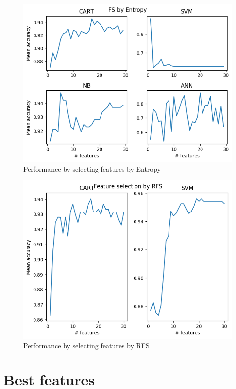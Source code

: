 \documentclass{kththesis}
\begin{document}
\begin{figure}[ht!]
  \includegraphics[width=\linewidth]{../plots/FS_by_Entropy.png}
  \caption{Performance by selecting features by Entropy}
  \label{fig:entropy}
\end{figure}

\begin{figure}[ht!]
  \includegraphics[width=\linewidth]{../plots/RFS.png}
  \caption{Performance by selecting features by RFS}
  \label{fig:rfs}
\end{figure}

\section{Best features}
\end{document}
